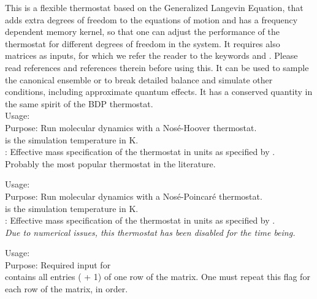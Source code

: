 This is a flexible thermostat based on the Generalized Langevin Equation, that
adds extra degrees of freedom to the equations of motion and has a frequency
dependent memory kernel, so that one can adjust the performance of the thermostat
for different degrees of freedom in the system. It requires also matrices
as inputs, for which we refer the reader to the keywords  and
. Please read references \cite{GLE1, GLE2, GLE3} and references therein before using this.
It can be used to sample the canonical ensemble or to break detailed balance
and simulate other conditions, including approximate quantum effects.
It has a conserved quantity in the same spirit of the BDP thermostat. \\



{\noindent
  Usage:   
    \\[1.0ex]
  Purpose: Run molecular dynamics with a Nos\'e-Hoover
    thermostat.\\[1.0ex]
   is the simulation temperature in K. \\
   : Effective mass specification of the thermostat in units as specified
    by . \\
}
Probably the most popular thermostat in the literature. 

{\noindent
  Usage:   
   \\[1.0ex]
  Purpose: Run molecular dynamics with a Nos\'e-Poincar\'e
    thermostat.\\[1.0ex]
   is the simulation temperature in K. \\
   : Effective mass specification of the thermostat in units as
    specified by . \\
}
\emph{Due to numerical issues, this thermostat has been disabled for the time being.}

{\noindent
  Usage:   \\[1.0ex]
  Purpose: Required input for  \\[1.0ex]
   contains all entries ( + 1) of one row of the matrix. One must repeat this flag for each row of the matrix, in order. 
  \\[1.0em]
}

